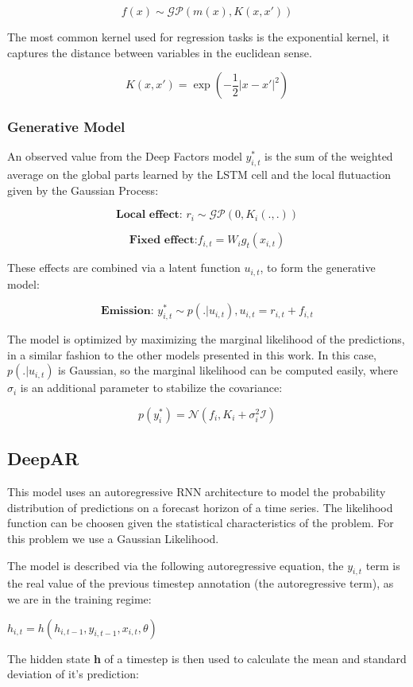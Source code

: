 \documentclass[11pt]{article}
\begin{document}
\[
f(x) \sim \mathcal{GP}( m(x), K(x,x'))
\]

The most common kernel used for regression tasks is the exponential kernel, it captures the distance between variables in 
the euclidean sense.

\[
  K(x,x') = \exp(-\frac{1}{2}|x - x'|^2)
\]

\subsubsection{Generative Model}
\label{sec:org78716f6}
An observed value from the Deep Factors model \(y^*_{i,t}\) is the sum of the weighted average on the global parts learned by the LSTM cell and the local flutuaction
given by the Gaussian Process:

\[
  \textbf{Local effect: }  r_i \sim \mathcal{GP} (0, K_i(.,.))
\]

\[
  \textbf{Fixed effect:}  f_{i,t} = W_ig_t(x_{i,t})
\]

These effects are combined via a latent function \(u_{i,t}\), to form the generative model: 

\[
  \textbf{Emission: }  y^*_{i,t} \sim p(. | u_{i,t}) , u_{i,t} = r_{i,t} + f_{i,t}  
\]

The model is optimized by maximizing the marginal likelihood of the predictions, in a similar fashion to the other models presented in this work. 
In this case, \(p(.|u_{i,t})\) is Gaussian, so the marginal likelihood can be computed easily, where \(\sigma_i\) is an additional parameter to stabilize the covariance:

\[
p(y^*_{i}) = \mathcal{N}(f_i,K_i + \sigma_i^2\mathcal{I})
\]

\subsection{DeepAR \cite{deepar}}
\label{sec:orga212533}

This model uses an autoregressive RNN architecture to model the probability distribution of predictions on a forecast horizon of a time series. The likelihood function can be choosen given the statistical
characteristics of the problem. For this problem we use a Gaussian Likelihood.

The model is described via the following autoregressive equation, the \(y_{i,t}\) term is the real value of the previous timestep annotation (the autoregressive term), as we are in the training regime:

\begin{center}
\(h_{i,t} = h(h_{i,t-1},y_{i,t-1},x_{i,t}, \theta)\)
\end{center}
The hidden state \textbf{\textbf{h}} of a timestep is then used to calculate the mean 
and standard deviation of it's prediction:
\end{document}
